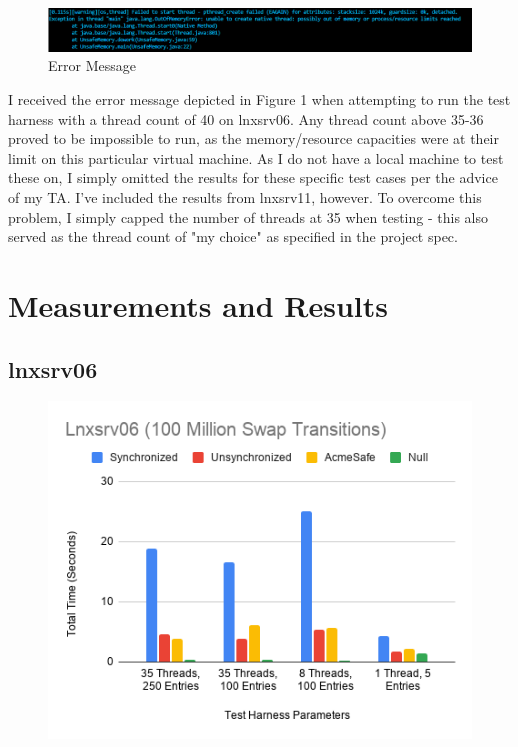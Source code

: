 \begin{figure}
\caption{Error Message}
\includegraphics[scale=.25, width=0.9\columnwidth]{limitsreached.PNG}
\end{figure}

I received the error message depicted in Figure 1 when attempting to run the test harness with a thread count of 40 on lnxsrv06. Any thread count above 35-36 proved to be impossible to run, as the memory/resource capacities were at their limit on this particular virtual machine. As I do not have a local machine to test these on, I simply omitted the results for these specific test cases per the advice of my TA. I've included the results from lnxsrv11, however. To overcome this problem, I simply capped the number of threads at 35 when testing - this also served as the thread count of "my choice" as specified in the project spec.


\section{Measurements and Results}
\subsection{lnxsrv06}
\begin{figure}
\caption{}
\includegraphics[scale=.5]{lnxsrv06.png} 
 \end{figure}
 


